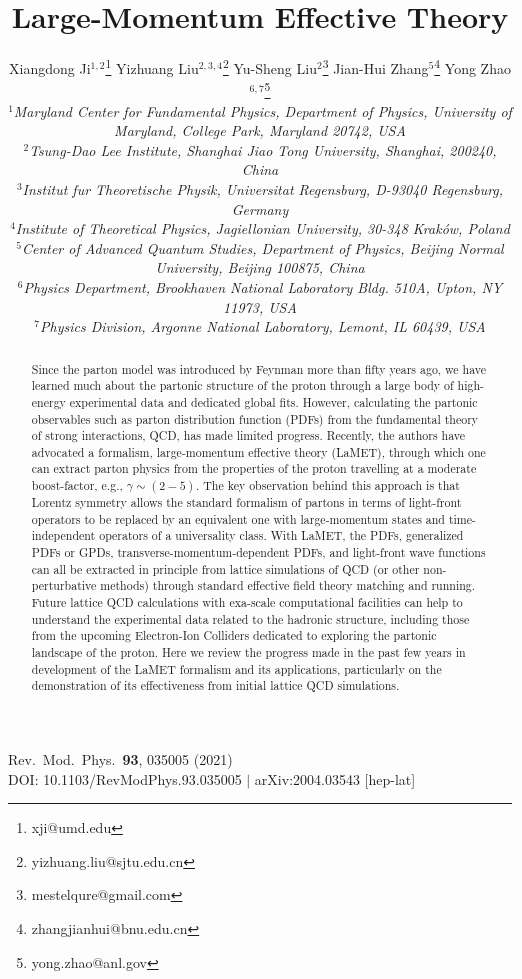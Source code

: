 \documentclass[11pt]{article}
\title{{\LARGE\bfseries Large-Momentum Effective Theory}}
\author{
Xiangdong Ji$^{1,2}$\footnote{xji@umd.edu}\quad
Yizhuang Liu$^{2,3,4}$\footnote{yizhuang.liu@sjtu.edu.cn}\quad
Yu-Sheng Liu$^{2}$\footnote{mestelqure@gmail.com}\quad
Jian-Hui Zhang$^{5}$\footnote{zhangjianhui@bnu.edu.cn}\quad
Yong Zhao$^{6,7}$\footnote{yong.zhao@anl.gov}\\[0.9em]
\normalsize\itshape
$^{1}$Maryland Center for Fundamental Physics, Department of Physics, University of Maryland,
College Park, Maryland 20742, USA\\[2pt]
$^{2}$Tsung-Dao Lee Institute, Shanghai Jiao Tong University, Shanghai, 200240, China\\[2pt]
$^{3}$Institut fur Theoretische Physik, Universitat Regensburg, D-93040 Regensburg, Germany\\[2pt]
$^{4}$Institute of Theoretical Physics, Jagiellonian University, 30-348 Krak\'ow, Poland\\[2pt]
$^{5}$Center of Advanced Quantum Studies, Department of Physics, Beijing Normal University, Beijing 100875, China\\[2pt]
$^{6}$Physics Department, Brookhaven National Laboratory Bldg. 510A, Upton, NY 11973, USA\\[2pt]
$^{7}$Physics Division, Argonne National Laboratory, Lemont, IL 60439, USA
}
\date{}
\begin{document}
\maketitle

\vspace{-6em}
\begin{flushright}\small
Rev.\ Mod.\ Phys.\ \textbf{93}, 035005 (2021)\\
DOI: 10.1103/RevModPhys.93.035005 \quad $\vert$ \quad arXiv:2004.03543 [hep-lat]
\end{flushright}

\renewcommand{\abstractname}{Abstract}
\begin{abstract}
Since the parton model was introduced by Feynman more than fifty years ago,
we have learned much about the partonic structure of the proton through a
large body of high-energy experimental data and dedicated global fits. However,
calculating the partonic observables such as parton distribution function (PDFs)
from the fundamental theory of strong interactions, QCD, has made limited
progress. Recently, the authors have advocated a formalism, large-momentum effective theory (LaMET),
through which one can extract parton physics from the properties of the proton
travelling at a moderate boost-factor, e.g., $\gamma\sim (2-5)$.
The key observation behind this approach is that Lorentz symmetry allows the standard
formalism of partons in terms of light-front operators to be replaced by
an equivalent one with large-momentum states and time-independent operators of
a universality class. With LaMET, the PDFs, generalized PDFs or GPDs,
transverse-momentum-dependent PDFs, and light-front wave functions
can all be extracted in principle from lattice simulations of
QCD (or other non-perturbative methods) through standard effective field theory matching
and running. Future lattice QCD calculations with exa-scale computational
facilities can help to understand the experimental data related to the
hadronic structure, including those from the upcoming Electron-Ion Colliders
dedicated to exploring the partonic landscape of the proton. Here we review the progress
made in the past few years in development of the LaMET formalism and its applications,
particularly on the demonstration of its effectiveness from initial lattice QCD simulations.
\end{abstract}

\tableofcontents{}
\clearpage









\end{document}
